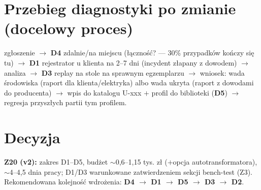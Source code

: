 \documentclass[11pt,a4paper]{article}
\begin{document}
\section{Przebieg diagnostyki po zmianie (docelowy proces)}
zgłoszenie $\to$ \textbf{D4} zdalnie/na miejscu (łączność? --- 30\% przypadków kończy się tu)
$\to$ \textbf{D1} rejestrator u klienta na 2--7 dni (incydent złapany z dowodem) $\to$ analiza
$\to$ \textbf{D3} replay na stole na sprawnym egzemplarzu $\to$ wniosek: wada środowiska (raport
dla klienta/elektryka) albo wada ukryta (raport z dowodami do producenta) $\to$ wpis do katalogu
U-xxx $+$ profil do biblioteki (\textbf{D5}) $\to$ regresja przyszłych partii tym profilem.

\section{Decyzja}
\textbf{Z20 (v2):} zakres D1--D5, budżet $\sim$0,6--1,15 tys. zł ($+$opcja autotransformatora),
$\sim$4--4,5 dnia pracy; D1/D3 warunkowane zatwierdzeniem sekcji bench-test (Z3). Rekomendowana
kolejność wdrożenia: \textbf{D4 $\to$ D1 $\to$ D5 $\to$ D3 $\to$ D2}.
\end{document}
